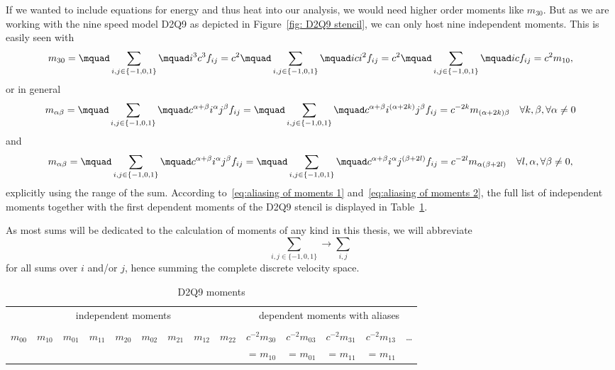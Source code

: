 If we wanted to include equations for energy and thus heat into our analysis, we would need higher order moments like $m_{30}$.
But as we are working with the nine speed model D2Q9 as depicted in Figure~\ref{fig: D2Q9 stencil}, we can only host nine independent moments.
This is easily seen with
\begin{equation}
  m_{30} = \mquad\sum_{i,j \in \{-1,0,1\}}\mquad i^3 c^3 f_{ij} = c^2\mquad\sum_{i,j \in \{-1,0,1\}}\mquad ic i^2 f_{ij} = c^2 \mquad\sum_{i,j \in \{-1,0,1\}}\mquad ic f_{ij} = c^2 m_{10},
\end{equation}
or in general
\begin{equation}
  \label{eq:aliasing of moments 1}
  m_{\alpha\beta}
  = \mquad\sum_{i,j \in \{-1,0,1\}}\mquad c^{\alpha+\beta} i^\alpha j^\beta f_{ij}
  = \mquad\sum_{i,j \in \{-1,0,1\}}\mquad c^{\alpha+\beta}i^{(\alpha+2k)} j^\beta f_{ij}
  = c^{-2k} m_{(\alpha+2k)\beta} \quad \forall k,\beta, \forall \alpha \neq 0
\end{equation}
and
\begin{equation}
  \label{eq:aliasing of moments 2}
  m_{\alpha\beta}
  = \mquad\sum_{i,j \in \{-1,0,1\}}\mquad c^{\alpha+\beta} i^\alpha j^\beta f_{ij}
  = \mquad\sum_{i,j \in \{-1,0,1\}}\mquad c^{\alpha+\beta} i^\alpha j^{(\beta+2l)} f_{ij}
  = c^{-2l}m_{\alpha(\beta+2l)} \quad \forall l, \alpha, \forall \beta \neq 0,
\end{equation}
explicitly using the range of the sum.
According to~\eqref{eq:aliasing of moments 1} and~\eqref{eq:aliasing of moments 2}, the full list of independent moments together with the first dependent moments of the D2Q9 stencil is displayed in Table~\ref{table:D2Q9 moments}.

As most sums will be dedicated to the calculation of moments of any kind in this thesis, we will abbreviate
\begin{equation*}
  \sum_{i,j \in \{-1,0,1\}} \rightarrow \sum_{i,j}
\end{equation*}
for all sums over $i$ and/or $j$, hence summing the complete discrete velocity space.

\setlength{\tabcolsep}{4.4pt}
\begin{table} [t]
  \centering
  \begin{tabular}{r rr rrr rr r rrrr r}
    \toprule
    \multicolumn{9}{c}{independent moments} & \multicolumn{5}{c}{dependent moments with aliases}   \\
    \cmidrule(lr){1-9}\cmidrule(lr){10-14} \\
    $m_{00}$
    & $m_{10}$
    & $m_{01}$
    & $m_{11}$
    & $m_{20}$
    & $m_{02}$
    & $m_{21}$
    & $m_{12}$
    & $m_{22}$
    & $c^{-2}m_{30}$
    & $c^{-2}m_{03}$
    & $c^{-2}m_{31}$
    & $c^{-2}m_{13}$
    & \ldots \\
    &&&&&&&&
    & = $m_{10}$
    & = $m_{01}$
    & = $m_{11}$
    & = $m_{11}$ & \\
    \bottomrule
  \end{tabular}
  \caption{D2Q9 moments}\label{table:D2Q9 moments}
\end{table}
